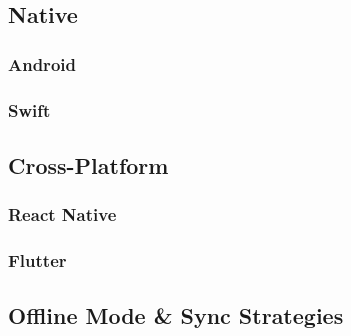 \subsection{Native}
\subsubsection{Android}
\subsubsection{Swift}

\subsection{Cross-Platform}
\subsubsection{React Native}
\subsubsection{Flutter}

\subsection{Offline Mode \& Sync Strategies}

